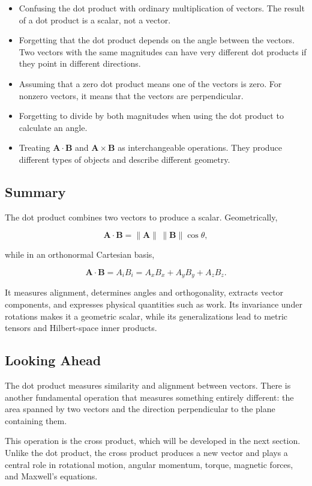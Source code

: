 \begin{itemize}
  \item Confusing the dot product with ordinary multiplication of vectors. The
  result of a dot product is a scalar, not a vector.
  \item Forgetting that the dot product depends on the angle between the
  vectors. Two vectors with the same magnitudes can have very different dot
  products if they point in different directions.
  \item Assuming that a zero dot product means one of the vectors is zero. For
  nonzero vectors, it means that the vectors are perpendicular.
  \item Forgetting to divide by both magnitudes when using the dot product to
  calculate an angle.
  \item Treating $\mathbf A\cdot\mathbf B$ and $\mathbf A\times\mathbf B$ as
  interchangeable operations. They produce different types of objects and
  describe different geometry.
\end{itemize}

\subsection{Summary}

The dot product combines two vectors to produce a scalar. Geometrically,

\[
\mathbf A\cdot\mathbf B
=
\lVert\mathbf A\rVert\,\lVert\mathbf B\rVert\cos\theta,
\]

while in an orthonormal Cartesian basis,

\[
\mathbf A\cdot\mathbf B
=
A_iB_i
=
A_xB_x+A_yB_y+A_zB_z.
\]

It measures alignment, determines angles and orthogonality, extracts vector
components, and expresses physical quantities such as work. Its invariance
under rotations makes it a geometric scalar, while its generalizations lead to
metric tensors and Hilbert-space inner products.

\subsection{Looking Ahead}

The dot product measures similarity and alignment between vectors. There is
another fundamental operation that measures something entirely different: the
area spanned by two vectors and the direction perpendicular to the plane
containing them.

This operation is the cross product, which will be developed in the next
section. Unlike the dot product, the cross product produces a new vector and
plays a central role in rotational motion, angular momentum, torque, magnetic
forces, and Maxwell's equations.

